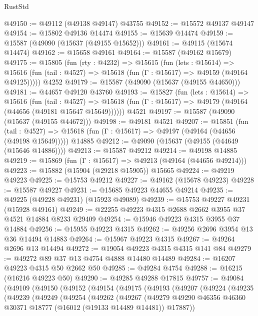 \begin{lexlean}{RustStd}
\begin{coremodule}
@49150 := @49112 (@49138 @49147) @43755
@49152 := @15572 @49137 @49147
@49154 := @15802 @49136 @14474
@49155 := @15639 @14474
@49159 := @15587 (@49090 (@15637 (@49155 @15652)))
@49161 := @49115 (@15674 @14474)
@49162 := @15658 @49161
@49164 := @15587 (@49162 @15679)
@49175 := @15805
    (fun (rty : @4232) =>
    @15615
      (fun (lets : @15614) =>
      @15616 (fun (tail : @4527) => @15618 (fun (Γ : @15617) => @49159 (@49164 @49125)))))
    @4252
@49179 := @15587 (@49090 (@15637 (@49155 @44650)))
@49181 := @44657 @49120 @43760
@49193 := @15827
    (fun (lets : @15614) =>
    @15616
      (fun (tail : @4527) =>
      @15618 (fun (Γ : @15617) => @49179 (@49164 (@44656 (@49181 @15647 @15649))))))
    @4521
@49197 := @15587 (@49090 (@15637 (@49155 @44672)))
@49198 := @49181 @4521
@49207 := @15851
    (fun (tail : @4527) => @15618 (fun (Γ : @15617) => @49197 (@49164 (@44656 (@49198 @15649)))))
    @14885
@49212 := @49090 (@15637 (@49155 (@44649 (@15646 @14886))))
@49213 := @15587 @49212
@49214 := @49198 @14885
@49219 := @15869 (fun (Γ : @15617) => @49213 (@49164 (@44656 @49214)))
@49223 := @15882 (@15904 (@29218 @15905)) @15665
@49224 := @49219 @49223
@49225 := @15753 @49212
@49227 := @49162 (@15678 @49223)
@49228 := @15587 @49227
@49231 := @15685 @49223 @44655 @49214
@49235 := @49225 (@49228 @49231) (@15923 @49089)
@49239 := @15753 @49227 @49231 (@15928 @49161)
@49249 := @22255 @49223 @4315 @2688 @2662 @3955 @37 @4521 @14884 @8233 @29409
@49254 := @15946 @49223 @4315 @3955 @37 @14884
@49256 := @15955 @49223 @4315
@49262 := @49256 @2696 @3954 @13 @36 @14494 @14883
@49264 := @15967 @49223 @4315
@49267 := @49264 @2696 @13 @14494
@49272 := @19054 @49223 @4315 @4315 @141 @84
@49279 := @49272 @89 @37 @13 @4754 @4888 @14480 @14489
@49284 := @16207 @49223 @4315 @50 @2662 @50
@49285 := @49284 @4754
@49288 := @16215 (@16216 @49223 @50)
@49290 := @49285 @49288 @17815
@49757 := @49084
    (@49109
      (@49150
        (@49152
          (@49154
            (@49175
              (@49193
                (@49207
                  (@49224
                    (@49235
                      (@49239
                        (@49249
                          (@49254
                            (@49262
                              (@49267
                                (@49279
                                  @49290
                                  @46356
                                  @46360
                                  @30371
                                  @18777
                                  (@16012 (@19133 @14489 @14481))
                                  @17887))

\end{coremodule}
\end{lexlean}
